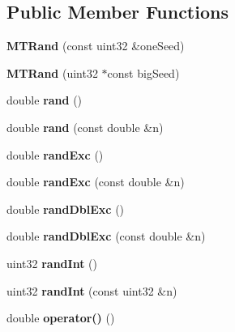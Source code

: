 \subsection*{Public Member Functions}
\begin{DoxyCompactItemize}
\item 
\mbox{\label{classMTRand_ab4f392e44228a583b7b1a3f036fb2fd0}} 
{\bfseries M\+T\+Rand} (const uint32 \&one\+Seed)
\item 
\mbox{\label{classMTRand_a22fbca78adae1fb4ff1cb103d85498f4}} 
{\bfseries M\+T\+Rand} (uint32 $\ast$const big\+Seed)
\item 
\mbox{\label{classMTRand_a76d129a2d850c24ff4a0613f299cf3a5}} 
double {\bfseries rand} ()
\item 
\mbox{\label{classMTRand_a7a47382fb7b19ae1f330691735dc800b}} 
double {\bfseries rand} (const double \&n)
\item 
\mbox{\label{classMTRand_afd05e468983b3a3d66ce0f403bd666af}} 
double {\bfseries rand\+Exc} ()
\item 
\mbox{\label{classMTRand_a2955abdb96e6cab97e50ac755d48dad1}} 
double {\bfseries rand\+Exc} (const double \&n)
\item 
\mbox{\label{classMTRand_a4d3a475aa72fe6d1a6d7d9e16d6a732e}} 
double {\bfseries rand\+Dbl\+Exc} ()
\item 
\mbox{\label{classMTRand_a587c90f52c35fa2bf05d34791dd5457e}} 
double {\bfseries rand\+Dbl\+Exc} (const double \&n)
\item 
\mbox{\label{classMTRand_ad1008efd4fe0e8aae30459c2c58cfe35}} 
uint32 {\bfseries rand\+Int} ()
\item 
\mbox{\label{classMTRand_a18ea21f615df06c9359c34d2eba6f252}} 
uint32 {\bfseries rand\+Int} (const uint32 \&n)
\item 
\mbox{\label{classMTRand_abbb87a08d622d58fdee0eea4cb5471a0}} 
double {\bfseries operator()} ()
\item 

\end{DoxyCompactItemize}
